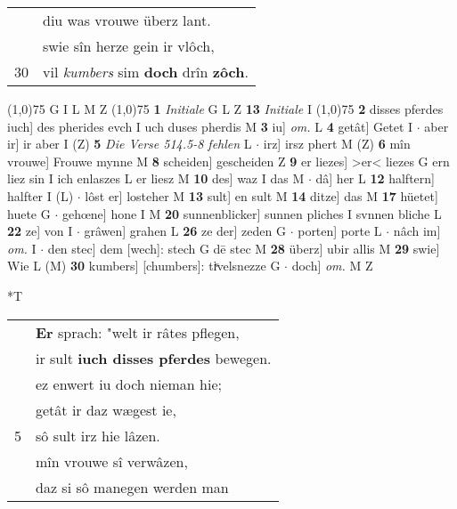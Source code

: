 \documentclass[8pt,a4paper,notitlepage]{article}
\begin{document}
\begin{table}[ht]
\begin{minipage}[t]{0.5\linewidth}
\begin{tabular}{rl}
 & diu was vrouwe überz lant.\\ 
 & swie sîn herze gein ir vlôch,\\ 
30 & vil \textit{kumbers} sim \textbf{doch} drîn \textbf{zôch}.\\ 
\end{tabular}
\scriptsize
\line(1,0){75} \newline
G I L M Z \newline
\line(1,0){75} \newline
\textbf{1} \textit{Initiale} G L Z  \textbf{13} \textit{Initiale} I  \newline
\line(1,0){75} \newline
\textbf{2} disses pferdes iuch] des pherides evch I uch duses pherdis M \textbf{3} iu] \textit{om.} L \textbf{4} getât] Getet I  $\cdot$ aber ir] ir aber I (Z) \textbf{5} \textit{Die Verse 514.5-8 fehlen} L   $\cdot$ irz] irsz phert M (Z) \textbf{6} mîn vrouwe] Frouwe mynne M \textbf{8} scheiden] gescheiden Z \textbf{9} er liezes] >er< liezes G ern liez sin I ich enlaszes L er liesz M \textbf{10} des] waz I das M  $\cdot$ dâ] her L \textbf{12} halftern] halfter I (L)  $\cdot$ lôst er] losteher M \textbf{13} sult] en sult M \textbf{14} ditze] das M \textbf{17} hüetet] huete G  $\cdot$ gehœne] hone I M \textbf{20} sunnenblicker] sunnen pliches I svnnen bliche L \textbf{22} ze] von I  $\cdot$ grâwen] grahen L \textbf{26} ze der] zeden G  $\cdot$ porten] porte L  $\cdot$ nâch im] \textit{om.} I  $\cdot$ den stec] dem [wech]: stech G dē stec M \textbf{28} überz] ubir allis M \textbf{29} swie] Wie L (M) \textbf{30} kumbers] [chumbers]: tiͮvelsnezze G  $\cdot$ doch] \textit{om.} M Z \newline
\end{minipage}
\hspace{0.5cm}
\begin{minipage}[t]{0.5\linewidth}
\small
\begin{center}*T
\end{center}
\begin{tabular}{rl}
 & \textbf{Er} sprach: "welt ir râtes pflegen,\\ 
 & ir sult \textbf{iuch disses pferdes} bewegen.\\ 
 & ez enwert iu doch nieman hie;\\ 
 & getât ir daz wægest ie,\\ 
5 & sô sult irz hie lâzen.\\ 
 & mîn vrouwe sî verwâzen,\\ 
 & daz si sô manegen werden man\\ 

\end{tabular}
\end{minipage}
\end{table}
\end{document}
